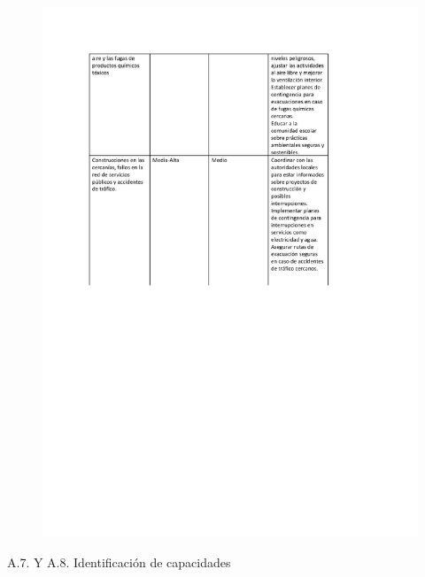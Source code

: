 \begin{figure}[H]
        \includegraphics[trim = {0mm 0mm 0mm 0mm},clip,scale=0.4]{20/img/Riesgos Externos2.pdf}
        \end{figure}
    A.7. Y A.8.  Identificación de capacidades
